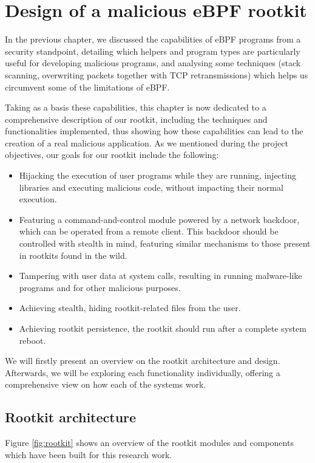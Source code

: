 \chapter{Design of a malicious eBPF rootkit}
In the previous chapter, we discussed the capabilities of eBPF programs from a security standpoint, detailing which helpers and program types are particularly useful for developing malicious programs, and analysing some techniques (stack scanning, overwriting packets together with TCP retransmissions) which helps us circumvent some of the limitations of eBPF.

Taking as a basis these capabilities, this chapter is now dedicated to a comprehensive description of our rootkit, including the techniques and functionalities implemented, thus showing how these capabilities can lead to the creation of a real malicious application. As we mentioned during the project objectives, our goals for our rootkit include the following:
\begin{itemize}
\item Hijacking the execution of user programs while they are running, injecting libraries and executing malicious code, without impacting their normal execution.
\item Featuring a command-and-control module powered by a network backdoor, which can be operated from a remote client. This backdoor should be controlled with stealth in mind, featuring similar mechanisms to those present in rootkits found in the wild.
\item Tampering with user data at system calls, resulting in running malware-like programs and for other malicious purposes.
\item Achieving stealth, hiding rootkit-related files from the user.
\item Achieving rootkit persistence, the rootkit should run after a complete system reboot.
\end{itemize}

We will firstly present an overview on the rootkit architecture and design. Afterwards, we will be exploring each functionality individually, offering a comprehensive view on how each of the systems work.


\section{Rootkit architecture}
Figure \ref{fig:rootkit} shows an overview of the rootkit modules and components which have been built for this research work.

